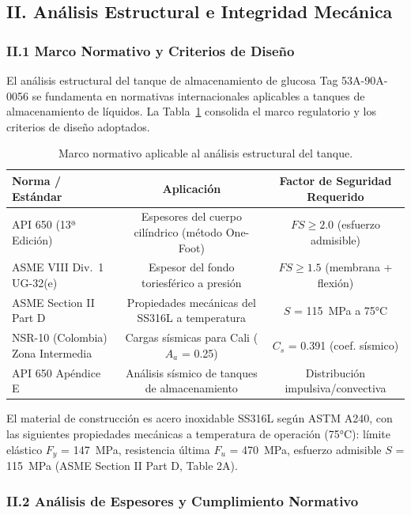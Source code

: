 \subsection*{II. Análisis Estructural e Integridad Mecánica}

\subsubsection*{II.1 Marco Normativo y Criterios de Diseño}

El análisis estructural del tanque de almacenamiento de glucosa Tag 53A-90A-0056 se fundamenta en normativas internacionales aplicables a tanques de almacenamiento de líquidos. La Tabla~\ref{tab:resumen_normativas} consolida el marco regulatorio y los criterios de diseño adoptados.

\begin{table}[H]
\centering
\caption{Marco normativo aplicable al análisis estructural del tanque.}
\label{tab:resumen_normativas}
\setcounter{itemcount}{0}
\begin{tabularx}{\textwidth}{@{}Xcc@{}}
\toprule
\textbf{Norma / Estándar} & \textbf{Aplicación} & \textbf{Factor de Seguridad Requerido} \\
\midrule
API 650 (13ª Edición) & Espesores del cuerpo cilíndrico (método One-Foot) & $FS \geq 2.0$ (esfuerzo admisible) \\
ASME VIII Div.~1 UG-32(e) & Espesor del fondo toriesférico a presión & $FS \geq 1.5$ (membrana + flexión) \\
ASME Section II Part D & Propiedades mecánicas del SS316L a temperatura & $S$ = 115~MPa a 75°C \\
NSR-10 (Colombia) Zona Intermedia & Cargas sísmicas para Cali ($A_a$ = 0.25) & $C_s$ = 0.391 (coef. sísmico) \\
API 650 Apéndice E & Análisis sísmico de tanques de almacenamiento & Distribución impulsiva/convectiva \\
\bottomrule
\end{tabularx}
\end{table}

El material de construcción es acero inoxidable SS316L según ASTM A240, con las siguientes propiedades mecánicas a temperatura de operación (75°C): límite elástico $F_y$ = 147~MPa, resistencia última $F_u$ = 470~MPa, esfuerzo admisible $S$ = 115~MPa (ASME Section II Part D, Table 2A).

\subsubsection*{II.2 Análisis de Espesores y Cumplimiento Normativo}

